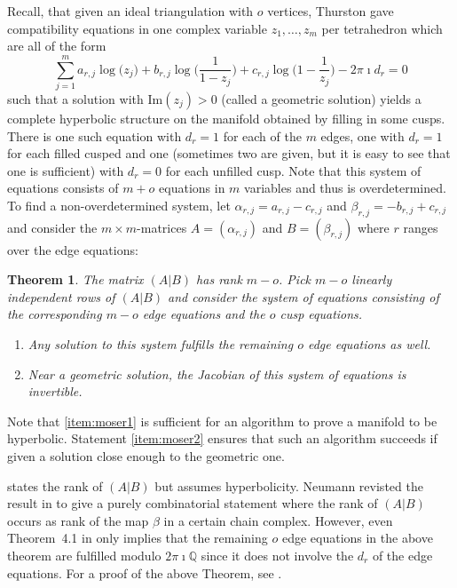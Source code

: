 \documentclass[utopia,fullpage]{nmd/article}
\newcommand\Q{\mathbb Q}
\newtheorem{theorem}{Theorem}[section]
\newcommand\myIm{\mathrm{Im}}
\newcommand\myI{\imath}
\begin{document}
Recall, that given an ideal triangulation with $o$ vertices, Thurston \cite[Chapter 4]{ThurstonNotes} gave compatibility equations in one complex variable $z_1,\dots,z_m$ per tetrahedron which are all of the form
$$\sum_{j=1}^m a_{r,j} \log\Big(z_j\Big) + b_{r,j} \log\Big(\frac{1}{1-z_j}\Big) + c_{r,j}\log\Big(1-\frac{1}{z_j}\Big) - 2\pi \myI d_r = 0$$
such that a solution with $\myIm(z_j)>0$ (called a geometric solution) yields a complete hyperbolic structure on the manifold obtained by filling in some cusps. There is one such equation with $d_r=1$ for each of the $m$ edges, one with $d_r=1$ for each filled cusped and one (sometimes two are given, but it is easy to see that one is sufficient) with $d_r=0$ for each unfilled cusp. Note that this system of equations consists of $m+o$ equations in $m$ variables and thus is overdetermined. To find a non-overdetermined system, let $\alpha_{r,j}=a_{r,j}-c_{r,j}$ and $\beta_{r,j}=-b_{r,j}+c_{r,j}$ and consider the $m\times m$-matrices $A=(\alpha_{r,j})$ and $B=(\beta_{r,j})$ where $r$ ranges over the edge equations:
\begin{theorem}
The matrix $(A|B)$ has rank $m-o$. Pick $m-o$ linearly independent rows of $(A|B)$ and consider the system of equations consisting of the corresponding $m-o$ edge equations and the $o$ cusp equations.
\begin{enumerate}
\item Any solution to this system fulfills the remaining $o$ edge equations as well.\label{item:moser1}
\item Near a geometric solution, the Jacobian of this system of equations is invertible.\label{item:moser2}
\end{enumerate}
\end{theorem}
Note that \eqref{item:moser1} is sufficient for an algorithm to prove a manifold to be hyperbolic. Statement \eqref{item:moser2} ensures that such an algorithm succeeds if given a solution close enough to the geometric one.

\cite{NeumannZagier} states the rank of $(A|B)$ but assumes hyperbolicity. Neumann revisted the result in \cite {NeumannComb} to give a purely combinatorial statement where the rank of $(A|B)$ occurs as rank of the map $\beta$ in a certain chain complex. However, even Theorem~4.1 in \cite{NeumannComb} only implies that the remaining $o$ edge equations in the above theorem are fulfilled modulo $2\pi\myI \Q$ since it does not involve the $d_r$ of the edge equations. For a proof of the above Theorem, see \cite[Section~2.3.1]{moser}.



\end{document}
